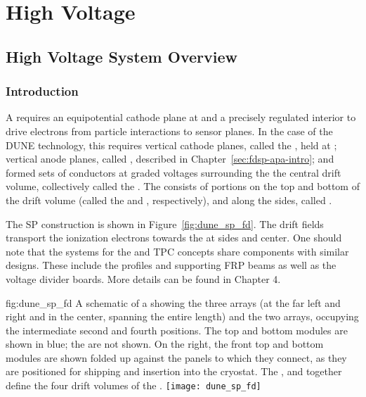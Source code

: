 \chapter{High Voltage}
\label{ch:sp-hv}
\section{High Voltage System Overview}
\label{sec:fdsp-hv-ov}

\subsection{Introduction}
\label{sec:fdsp-hv-intro}

A  requires an equipotential cathode plane at  and a precisely regulated interior \efield{} to drive 
electrons from particle interactions to sensor planes.  In the case of the DUNE  technology, 
this requires vertical cathode planes, called the , held at ; vertical anode planes, called , described in Chapter~\ref{sec:fdsp-apa-intro}; and formed sets of conductors at graded voltages surrounding the
 the central drift volume, collectively called the . The  consists of portions on the top and bottom  
of the drift volume (called the  and , respectively), and along the sides, called .


The SP  construction is shown in Figure~\ref{fig:dune_sp_fd}.
The  drift fields transport the ionization electrons 
towards the  at sides and center.
One should note that the  systems for the \single and \dual TPC concepts share components with similar designs. These include the  profiles and supporting FRP beams as well as the voltage divider boards. More details can be found in  Chapter 4.


\begin{dunefigure}%
{fig:dune_sp_fd}
{%
A schematic of a  showing the three  arrays (at the far left and right and in the center, spanning the entire  length) and the two  arrays, occupying the intermediate second and fourth positions. The top and bottom  modules are shown in blue; the  are not shown. 
On the right, the front top and bottom  modules are shown folded up against the  panels to which they connect, as they are positioned for shipping and insertion into the cryostat.  The ,  and  together define the four drift volumes of the .}
\texttt{[image: dune\_sp\_fd]}
\end{dunefigure}

